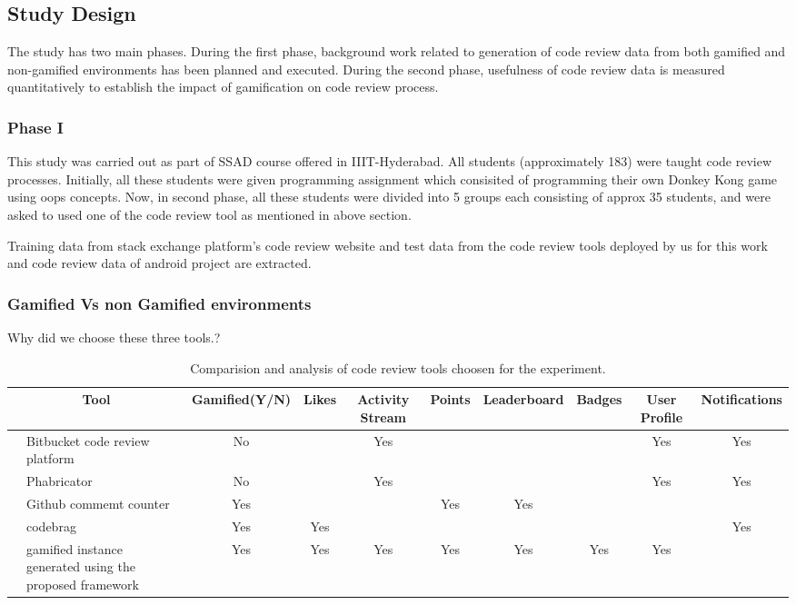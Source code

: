 \documentclass[conference]{IEEEtran}
\newcounter{magicrownumbers}
\newcommand\rownumber{\stepcounter{magicrownumbers}\arabic{magicrownumbers}}
\begin{document}
\subsection{Study Design}
The study has two main phases. During the first phase, background work related to generation of code review data from both gamified and non-gamified environments has been planned and executed. During the second phase, usefulness of code review data is measured quantitatively to establish the impact of gamification on code review process.

\subsubsection{Phase I}
This study was carried out as part of SSAD course offered in IIIT-Hyderabad\cite{Sripada2015}. All students (approximately 183) were taught code review processes. Initially, all these students were given programming assignment which consisited of programming their own Donkey Kong game using oops concepts.
Now, in second phase, all these students were divided into 5 groups each consisting of approx 35 students, and were asked to used one of the code review tool as mentioned in above section.
  
  
Training data from stack exchange platform's code review website and test data from the code review tools deployed by us for this work and code review data of android project are extracted. 


\subsubsection{Gamified Vs non Gamified environments}

\item Why did we choose these three tools.?

\begin{table*}[ht]
\centering
\caption{Comparision and analysis of code review tools choosen for the experiment.}
\begin{tabular}{|c|p{2.5cm}|c||c|c|c|c|c|c|c|} \hline
\multicolumn{2}{|c|}{Tool} & Gamified(Y/N) & Likes & Activity Stream & Points & Leaderboard	& Badges & User Profile & Notifications  \\ \hline \hline
 \setcounter{magicrownumbers}{0}\rownumber & Bitbucket code review platform & No &  & Yes & & & & Yes & Yes \\ 
 \rownumber & Phabricator & No &  & Yes & & & & Yes & Yes \\
 \rownumber & Github commemt counter & Yes &  & & Yes & Yes & & & \\
 \rownumber & codebrag & Yes & Yes & & & & & & Yes \\
 \rownumber & gamified instance generated using the proposed framework & Yes & Yes & Yes & Yes & Yes & Yes & Yes &  \\
 \hline
\end{tabular}
\label{tab:gamedesignelements}
\end{table*}
\end{document}
